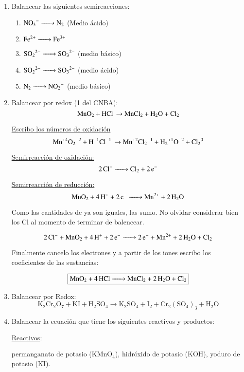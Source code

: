 \begin{enumerate}

\item Balancear las siguientes semireacciones:
\begin{enumerate}
    \item $\ce{ NO_3^- -> N_2 }$ (Medio ácido)
    \item $\ce{ Fe^{2+} -> Fe^{3+} }$
    \item $\ce{ SO_2^{\;2-} -> SO_3^{\;2-} }$ (medio básico)
    \item $\ce{ SO_2^{\;2-} -> SO_3^{\;2-} }$ (medio ácido)
    \item $\ce{ N_2 -> NO_2^- }$ (medio básico)
\end{enumerate}


\item Balancear por redox (1 del CNBA):
$$\ce{MnO_2 + HCl \rightarrow MnCl_2 + H_2O + Cl_2}$$

\underline{Escribo los números de oxidación}
$$\ce{Mn^{+4}O_2^{-2} + H^{+1}Cl^{-1} \rightarrow Mn^{+2}Cl_2^{-1} + H_2^{+1}O^{-2} + Cl_2^{0}}$$

\begin{multicols}{2}
    \underline{Semirreacción de oxidación:}
    $$\ce{2Cl^- ->
    Cl_2 + 2e^-}$$
    
    \underline{Semirreacción de reducción:}
    $$\ce{MnO_2 + 4 H^+ + 2e^- ->
    Mn^{2+} + 2H_2O}$$
\end{multicols}

Como las cantidades de  ya son iguales, las sumo. No olvidar considerar bien los Cl al momento de terminar de balencear.

$$\ce{2 Cl^- + MnO_2 + 4H^+ + 2e^- -> 2e^- + Mn^{2+} + 2H_2O + Cl_2}$$

Finalmente cancelo los electrones y a partir de los iones escribo los coeficientes de las sustancias:

$$\fbox{\ce{MnO_2 + 4HCl -> MnCl_2 + 2H_2O + Cl_2}}$$


\item Balancear por Redox:
$$\text{K}_2\text{Cr}_2\text{O}_7 + \text{KI} + \text{H}_2\text{SO}_4 \longrightarrow \text{K}_2\text{SO}_4 + \text{I}_2 + \text{Cr}_2(\text{SO}_4)_3 + \text{H}_2\text{O}$$


\item Balancear la ecuación que tiene los siguientes reactivos y productos:

\underline{Reactivos}:

permanganato de potasio (KMnO$_4$), hidróxido de potasio (KOH), yoduro de potasio (KI).


\end{enumerate}
